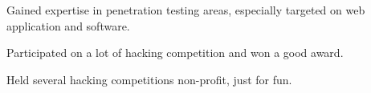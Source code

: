 

\begin{cventries}

	\cventry
	{} %
	{} %
	{} %
	{} %
	{
		\begin{cvitems} %
		\item {Gained expertise in penetration testing areas, especially targeted on web application and software.}
		\item {Participated on a lot of hacking competition and won a good award.}
		\item {Held several hacking competitions non-profit, just for fun.}
		\end{cvitems}
	}
\end{cventries}
